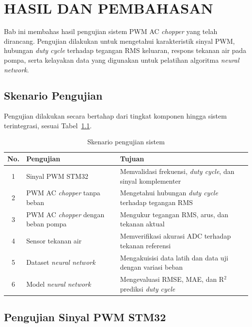 ﻿\chapter{HASIL DAN PEMBAHASAN}
\label{chap:hasil_dan_pembahasan}

Bab ini membahas hasil pengujian sistem PWM AC \emph{chopper} yang telah
dirancang. Pengujian dilakukan untuk mengetahui karakteristik sinyal PWM,
hubungan \emph{duty cycle} terhadap tegangan RMS keluaran, respons tekanan
air pada pompa, serta kelayakan data yang digunakan untuk pelatihan algoritma
\emph{neural network}.

\section{Skenario Pengujian}
\label{sec:skenario-pengujian}

Pengujian dilakukan secara bertahap dari tingkat komponen hingga sistem
terintegrasi, sesuai Tabel~\ref{tab:skenario-pengujian}.

\begin{table}[H]
\centering
\caption{Skenario pengujian sistem}
\label{tab:skenario-pengujian}
\begin{tabularx}{\linewidth}{|c|>{\raggedright\arraybackslash\hsize=0.9\hsize}X|>{\raggedright\arraybackslash\hsize=1.1\hsize}X|}
\hline
\textbf{No.} &
\textbf{Pengujian} &
\textbf{Tujuan} \\
\hline
1 & Sinyal PWM STM32 &
Memvalidasi frekuensi, \emph{duty cycle}, dan sinyal komplementer \\
\hline
2 & PWM AC \emph{chopper} tanpa beban &
Mengetahui hubungan \emph{duty cycle} terhadap tegangan RMS \\
\hline
3 & PWM AC \emph{chopper} dengan beban pompa &
Mengukur tegangan RMS, arus, dan tekanan aktual \\
\hline
4 & Sensor tekanan air &
Memverifikasi akurasi ADC terhadap tekanan referensi \\
\hline
5 & Dataset \emph{neural network} &
Mengakuisisi data latih dan data uji dengan variasi beban \\
\hline
6 & Model \emph{neural network} &
Mengevaluasi RMSE, MAE, dan R$^2$ prediksi \emph{duty cycle} \\
\hline
\end{tabularx}
\end{table}

\section{Pengujian Sinyal PWM STM32}
\label{sec:pengujian-pwm-stm32}

